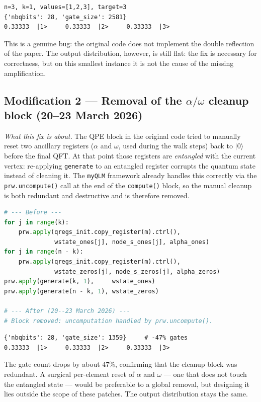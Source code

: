 \documentclass[11pt,a4paper]{article}
\begin{document}
\begin{lstlisting}[style=plain]
n=3, k=1, values=[1,2,3], target=3
{'nbqbits': 28, 'gate_size': 2581}
0.33333  |1>     0.33333  |2>     0.33333  |3>
\end{lstlisting}

This is a genuine bug: the original code does not implement the
double reflection of the paper. The output distribution, however,
is still flat: the fix is necessary for correctness, but on this
smallest instance it is not the cause of the missing amplification.

\subsection*{Modification 2 --- Removal of the
$\alpha/\omega$ cleanup block (20--23 March 2026)}

\emph{What this fix is about.} The QPE block in the original
code tried to manually reset two ancillary registers ($\alpha$ and
$\omega$, used during the walk steps) back to $|0\rangle$ before
the final QFT. At that point those registers are \emph{entangled}
with the current vertex: re-applying \texttt{generate} to an
entangled register corrupts the quantum state instead of cleaning
it. The \texttt{myQLM} framework already handles this correctly via
the \texttt{prw.uncompute()} call at the end of the
\texttt{compute()} block, so the manual cleanup is both redundant
and destructive and is therefore removed.

\begin{lstlisting}[language=Python]
# --- Before ---
for j in range(k):
    prw.apply(qregs_init.copy_register(m).ctrl(),
              wstate_ones[j], node_s_ones[j], alpha_ones)
for j in range(n - k):
    prw.apply(qregs_init.copy_register(m).ctrl(),
              wstate_zeros[j], node_s_zeros[j], alpha_zeros)
prw.apply(generate(k, 1),     wstate_ones)
prw.apply(generate(n - k, 1), wstate_zeros)

# --- After (20--23 March 2026) ---
# Block removed: uncomputation handled by prw.uncompute().
\end{lstlisting}

\begin{lstlisting}[style=plain]
{'nbqbits': 28, 'gate_size': 1359}     # -47% gates
0.33333  |1>     0.33333  |2>     0.33333  |3>
\end{lstlisting}

The gate count drops by about $47\%$, confirming that the cleanup
block was redundant. A surgical per-element reset of $\alpha$ and
$\omega$ --- one that does not touch the entangled state --- would
be preferable to a global removal, but designing it lies outside
the scope of these patches. The output distribution stays the same.
\end{document}
